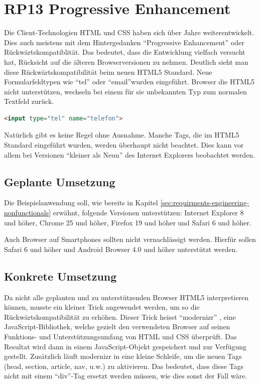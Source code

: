 \section{RP13 Progressive Enhancement}
\label{sec:principle-rp13-progressive-enhancement}

Die Client-Technologien HTML und CSS haben sich über Jahre weiterentwickelt. Dies auch meistens mit dem Hintergedanken ``Progressive Enhancement'' oder Rückwärtskompatiblität. Das bedeutet, dass die Entwicklung vielfach versucht hat, Rücksicht auf die älteren Browserversionen zu nehmen.
Deutlich sieht man diese Rückwärtskompatibilität beim neuen HTML5 Standard. Neue Formularfeldtypen wie ``tel'' oder ``email''wurden eingeführt. Browser die HTML5 nicht unterstützen, wechseln bei einem für sie unbekannten Typ zum normalen Textfeld zurück.

\begin{lstlisting}[language=HTML, caption={Formularfeld mit HTML5, welches eine Telefonnummer erwartet}, label={lst:html5TelInput}]
<input type="tel" name="telefon">
\end{lstlisting}

Natürlich gibt es keine Regel ohne Ausnahme. Manche Tags, die im HTML5 Standard eingeführt wurden, werden überhaupt nicht beachtet. Dies kann vor allem bei Versionen ``kleiner als Neun'' des Internet Explorers beobachtet werden.

\subsection*{Geplante Umsetzung}
Die Beispielanwendung soll, wie bereits in Kapitel \ref{sec:requirments-engineering-nonfunctionals} erwähnt, folgende Versionen unterstützen: Internet Explorer 8 und höher, Chrome 25 und höher, Firefox 19 und höher und Safari 6 und höher.

Auch Browser auf Smartphones sollten nicht vernachlässigt werden. Hierfür sollen Safari 6 und höher und Android Browser 4.0 und höher unterstützt werden.

\subsection*{Konkrete Umsetzung}
Da nicht alle geplanten und zu unterstützenden Browser HTML5 interpretieren können, musste ein kleiner Trick angewendet werden, um so die Rückwärtskompatibilität zu erhöhen. Dieser Trick heisst ``modernizr'' \cite{modernizr}, eine JavaScript-Bibliothek, welche gezielt den verwendeten Browser auf seinen Funktions- und Unterstützungsumfang von HTML und CSS überprüft. Das Resultat wird dann in einem JavaScript-Objekt gespeichert und zur Verfügung gestellt.  Zusätzlich läuft modernizr in eine kleine Schleife, um die neuen Tags (head, section, article, nav, u.w.) zu aktivieren. Das bedeutet, dass diese Tags nicht mit einem ``div''-Tag ersetzt werden müssen, wie dies sonst der Fall wäre.

